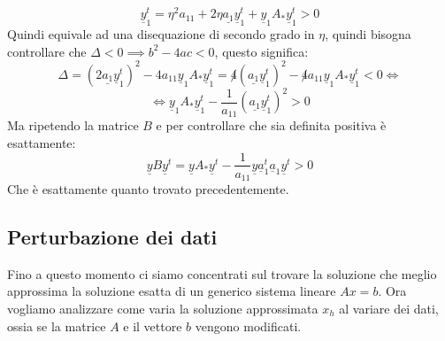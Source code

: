 \begin{itemize}
\begin{equation*}
              \underline{y}_1^t = \eta^2 a_{11}+2\eta\underline{a_1}\underline{y}_1^t +
              \underline{y}_1 A_\ast \underline{y}_1^t>0
          \end{equation*}
          Quindi equivale ad una disequazione di secondo grado in $\eta$, quindi
          bisogna controllare che $\Delta < 0\implies b^2-4ac<0$, questo significa:
          \begin{equation*}
              \Delta =(2\underline{a_1}\underline{y}_1^t)^2 -4a_{11}
              \underline{y}_1 A_\ast \underline{y}_1^t = \not 4(\underline{a_1}
              \underline{y}_1^t)^2 -\not 4 a_{11} \underline{y}_1 A_\ast \underline{y}_1^t
              < 0\iff
          \end{equation*}
          \begin{equation*}
              \iff \underline{y}_1 A_\ast \underline{y}_1^t - \frac{1}{a_{11}}
              (\underline{a_1}\underline{y}_1^t)^2>0
          \end{equation*}
          Ma ripetendo la matrice $B$ e per controllare che sia definita positiva
          è esattamente:
          \begin{equation*}
              \underline{y}B\underline{y}^t=\underline{y}A_\ast\underline{y}^t -
              \frac{1}{a_{11}} \underline{y}\underline{a}_1^t \underline{a}_1\underline{y}^t >0
          \end{equation*}
          Che è esattamente quanto trovato precedentemente.
\end{itemize}

\subsection{Perturbazione dei dati}
Fino a questo momento ci siamo concentrati sul trovare la soluzione che meglio
approssima la soluzione esatta di un generico sistema lineare $Ax=b$. Ora vogliamo
analizzare come varia la soluzione approssimata $x_h$ al variare dei dati, ossia
se la matrice $A$ e il vettore $b$ vengono modificati.

